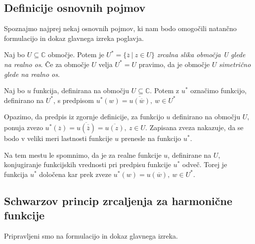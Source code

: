\documentclass[mat1, tisk]{fmfdelo}
\begin{document}
\subsection{Definicije osnovnih pojmov}

    Spoznajmo najprej nekaj osnovnih pojmov, ki nam bodo omogočili natančno formulacijo in dokaz glavnega izreka poglavja.
    \begin{definicija}
        Naj bo $U \subseteq \mathbb{C}$ območje. Potem je $U^* = \{\overline{z}~|~z \in U\}$ \emph{zrcalna slika območja U glede na realno os}.
        Če za območje $U$ velja $U^* = U$ pravimo, da je območje $U$ \emph{simetrično glede na realno os}.
    \end{definicija}

    \begin{definicija}
        Naj bo $u$ funkcija, definirana na območju $U \subseteq \mathbb{C}$. Potem z \emph{$u^*$} označimo funkcijo, definirano na $U^*$, s predpisom $u^*(w) = \overline{u(\overline{w})},~w \in U^*$
    \end{definicija}

    Opazimo, da predpis iz zgornje definicije, za funkcijo $u$ definirano na območju $U$, ponuja zvezo $u^*(\overline{z}) = \overline{u(\overline{\overline{z}})} = \overline{u(z)},~z \in U$.
    Zapisana zveza nakazuje, da se bodo v veliki meri lastnosti funkcije $u$ prenesle na funkcijo $u^*$.

    \begin{opomba}
        Na tem mestu le spomnimo, da je za realne funkcije $u$, definirane na $U$, konjugiranje funkcijskih vrednosti pri predpisu funkcije $u^*$ odveč. Torej je funkcija $u^*$ določena kar prek zveze $u^*(w) = u(\overline{w}),~w \in U^*$.
    \end{opomba}

\subsection{Schwarzov princip zrcaljenja za harmonične funkcije}

    Pripravljeni smo na formulacijo in dokaz glavnega izreka. 
\end{document}
